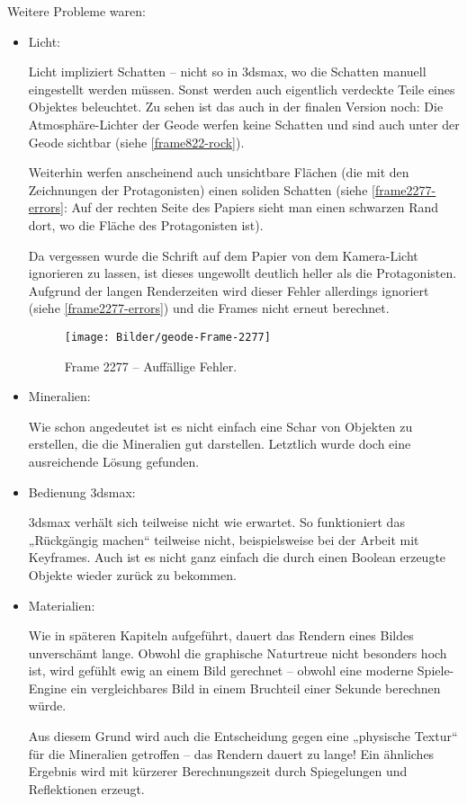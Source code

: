 \documentclass{scrreprt}
\begin{document}
Weitere Probleme waren:
\begin{itemize}
\item Licht:

Licht impliziert Schatten -- nicht so in 3dsmax, wo die Schatten manuell eingestellt werden müssen. Sonst werden auch eigentlich verdeckte Teile eines Objektes beleuchtet. Zu sehen ist das auch in der finalen Version noch: Die Atmosphäre-Lichter der Geode werfen keine Schatten und sind auch unter der Geode sichtbar (siehe \autoref{frame822-rock}).

Weiterhin werfen anscheinend auch unsichtbare Flächen (die mit den Zeichnungen der Protagonisten) einen soliden Schatten (siehe \autoref{frame2277-errors}: Auf der rechten Seite des Papiers sieht man einen schwarzen Rand dort, wo die Fläche des Protagonisten ist).

Da vergessen wurde die Schrift auf dem Papier von dem Kamera-Licht ignorieren zu lassen, ist dieses ungewollt deutlich heller als die Protagonisten. Aufgrund der langen Renderzeiten wird dieser Fehler allerdings ignoriert (siehe \autoref{frame2277-errors}) und die Frames nicht erneut berechnet.

\begin{figure}[!ht]
\centering
\texttt{[image: Bilder/geode-Frame-2277]}
\caption{Frame 2277 -- Auffällige Fehler.}
\label{frame2277-errors}
\end{figure}
\item Mineralien:

Wie schon angedeutet ist es nicht einfach eine Schar von Objekten zu erstellen, die die Mineralien gut darstellen. Letztlich wurde doch eine ausreichende Lösung gefunden.
\item Bedienung 3dsmax:

3dsmax verhält sich teilweise nicht wie erwartet. So funktioniert das „Rückgängig machen“ teilweise nicht, beispielsweise bei der Arbeit mit Keyframes. Auch ist es nicht ganz einfach die durch einen Boolean erzeugte Objekte wieder zurück zu bekommen.
\item Materialien:

Wie in späteren Kapiteln aufgeführt, dauert das Rendern eines Bildes unverschämt lange. Obwohl die graphische Naturtreue nicht besonders hoch ist, wird gefühlt ewig an einem Bild gerechnet -- obwohl eine moderne Spiele-Engine ein vergleichbares Bild in einem Bruchteil einer Sekunde berechnen würde.

Aus diesem Grund wird auch die Entscheidung gegen eine „physische Textur“ für die Mineralien getroffen -- das Rendern dauert zu lange! Ein ähnliches Ergebnis wird mit kürzerer Berechnungszeit durch Spiegelungen und Reflektionen erzeugt.
\end{itemize}
\end{document}
